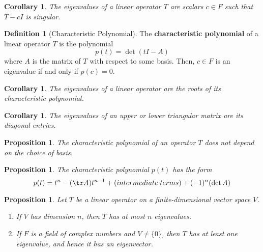 \documentclass[12pt]{article}
\newtheorem{cor}[thm]{Corollary}
\newtheorem{prop}[thm]{Proposition}
\theoremstyle{definition}
\newtheorem{defn}[thm]{Definition}
\theoremstyle{remark}
\numberwithin{equation}{section}
\newcommand\B[1]{\textbf{ #1}}
\begin{document}
\begin{cor}
        The eigenvalues of a linear operator $T$ are scalars $c \in F$ such that $T - cI$ is singular.
\end{cor}


\vspace{15pt}

\begin{defn}[Characteristic Polynomial]
        The \B{characteristic polynomial} of a linear operator $T$ is the polynomial \begin{equation}
                p(t) = \det(tI - A)
        \end{equation}
        where $A$ is the matrix of $T$ with respect to some basis. Then, $c \in F$ is an eigenvalue if and only if $p(c) = 0$.
\end{defn}


\vspace{15pt}

\begin{cor}
        The eigenvalues of a linear operator are the roots of its characteristic polynomial.
\end{cor}

\vspace{15pt}

\begin{cor}
        The eigenvalues of an upper or lower triangular matrix are its diagonal entries.
\end{cor}

\vspace{15pt}

\begin{prop}
        The characteristic polynomial of an operator $T$ does not depend on the choice of basis.
\end{prop}

\vspace{15pt}

\begin{prop}
        The characteristic polynomial $p(t)$ has the form \begin{equation}
                p(t) = t^n - (\tr A)t^{n-1} + (intermediate\;terms)+ (-1)^n(\det A)
        \end{equation}
\end{prop}

\vspace{15pt}

\begin{prop}
        Let $T$ be a linear operator on a finite-dimensional vector space $V$.\begin{enumerate}
                \item If $V$ has dimension $n$, then $T$ has at most $n$ eigenvalues.
                \item If $F$ is a field of complex numbers and $V \neq \{0\}$, then $T$ has at least one eigenvalue, and hence it has an eigenvector.
        \end{enumerate}
\end{prop}
\end{document}
